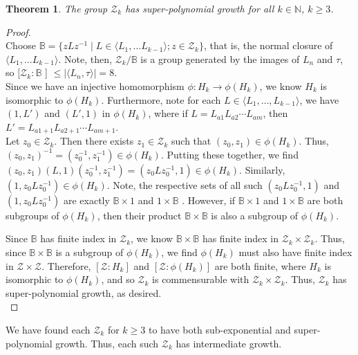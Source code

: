 \documentclass[11pt]{amsart}
\newtheorem{theorem}{Theorem}[section]
\theoremstyle{definition}
\theoremstyle{remark}
\numberwithin{equation}{section}
\begin{document}
\begin{theorem}
The group $\mathcal{Z}_k$ has super-polynomial growth for all $k\in \mathbb{N}$, $k\geq 3$.\\
\end{theorem}

\begin{proof}\text{\space}\\
\indent Choose $\mathbb{B}=\{zLz^{-1} \mid L\in \langle L_1,\ldots L_{k-1}\rangle; z\in \mathcal{Z}_k\}$, that is, the normal closure of $\langle L_1,\ldots L_{k-1}\rangle$. Note, then, $\mathcal{Z}_k/\mathbb{B}$ is a group generated by the images of $L_n$ and $\tau$, so $[\mathcal{Z}_k:\mathbb{B}$ ] $\leq|\langle L_n,\tau\rangle|=8$.\\
\indent Since we have an injective homomorphism $\phi:H_k\to \phi(H_k)$, we know $H_k$ is isomorphic to $\phi(H_k)$. Furthermore, note for each $L\in \langle L_1,\ldots,L_{k-1}\rangle$, we have $(1,L')$ and $(L',1)$ in $\phi(H_k)$, where if $L=L_{a1}L_{a2}\cdots L_{am}$, then $L'=L_{a1+1}L_{a2+1}\cdots L_{am+1}$.\\
\indent Let $z_0\in \mathcal{Z}_k$. Then there exists $z_1\in \mathcal{Z}_k$ such that $(z_0,z_1)\in \phi(H_k)$. Thus, $(z_0,z_1)^{-1}=(z_0^{-1},z_1^{-1})\in \phi(H_k)$. Putting these together, we find $(z_0,z_1)(L,1)(z_0^{-1},z_1^{-1})=(z_0Lz_0^{-1},1)\in \phi(H_k)$. Similarly, $(1,z_0Lz_0^{-1})\in \phi(H_k)$. Note, the respective sets of all such $(z_0Lz_0^{-1},1)$ and $(1,z_0Lz_0^{-1})$ are exactly $\mathbb{B}\times 1$ and $1\times \mathbb{B}$ . However, if $\mathbb{B}\times 1$ and $1\times \mathbb{B}$ \text{\space}are both subgroups of $\phi(H_k)$, then their product $\mathbb{B}\times\mathbb{B}$ is also a subgroup of $\phi(H_k)$.


\indent Since $\mathbb{B}$ \text{\space}has finite index in $\mathcal{Z}_k$, we know $\mathbb{B}\times\mathbb{B}$ \text{\space}has finite index in $\mathcal{Z}_k\times \mathcal{Z}_k$. Thus, since $\mathbb{B}\times \mathbb{B}$ is a subgroup of $\phi(H_k)$, we find $\phi(H_k)$ must also have finite index in $\mathcal{Z}\times \mathcal{Z}$. Therefore, $[\mathcal{Z}:H_k]$ and $[\mathcal{Z}:\phi(H_k)]$ are both finite, where $H_k$ is isomorphic to $\phi(H_k)$, and so $\mathcal{Z}_k$ is commensurable with $\mathcal{Z}_k\times \mathcal{Z}_k$. Thus, $\mathcal{Z}_k$ has super-polynomial growth, as desired.\\
\end{proof}

We have found each $\mathcal{Z}_k$ for $k\geq 3$ to have both sub-exponential and super-polynomial growth. Thus, each such $\mathcal{Z}_k$ has intermediate growth. 
\end{document}

